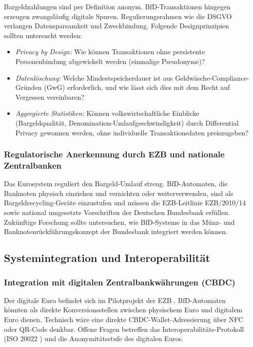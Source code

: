 ﻿\documentclass[a4paper,12pt]{article}
\theoremstyle{definition}
\begin{document}
Bargeldzahlungen sind per Definition anonym.  BfD-Transaktionen hingegen
erzeugen zwangsläufig digitale Spuren.  Regulierungsrahmen wie die DSGVO \cite{gdpr2016}
verlangen Datensparsamkeit und Zweckbindung.  Folgende Designprinzipien sollten
untersucht werden:
\begin{itemize}
  \item \emph{Privacy by Design:} Wie können Transaktionen ohne persistente
        Personenbindung abgewickelt werden (einmalige Pseudonyme)?
  \item \emph{Datenlöschung:} Welche Mindestspeicherdauer ist aus
        Geldwäsche-Compliance-Gründen (GwG) erforderlich, und wie lässt
        sich dies mit dem Recht auf Vergessen vereinbaren?
  \item \emph{Aggregierte Statistiken:} Können volkswirtschaftliche Einblicke
        (Bargeldqualität, Denomination-Umlaufgeschwindigkeit) durch
        Differential Privacy \cite{dwork2006differential} gewonnen werden,
        ohne individuelle Transaktionsdaten preiszugeben?
\end{itemize}

\subsubsection{Regulatorische Anerkennung durch EZB und nationale Zentralbanken}

Das Eurosystem reguliert den Bargeld-Umlauf streng.  BfD-Automaten, die
Banknoten physisch einziehen und vernichten oder weiterverwenden,
sind als Bargeldrecycling-Geräte einzustufen und müssen die EZB-Leitlinie
EZB/2010/14 \cite{ecb2010} sowie national umgesetzte Vorschriften der Deutschen
Bundesbank \cite{bundesbank2024} erfüllen.
Zukünftige Forschung sollte untersuchen, wie BfD-Systeme in das
Münz- und Banknotenrückführungskonzept der Bundesbank integriert werden können.

\subsection{Systemintegration und Interoperabilität}

\subsubsection{Integration mit digitalen Zentralbankwährungen (CBDC)}

Der digitale Euro befindet sich im Pilotprojekt der EZB \cite{ecb2023digital}.
BfD-Automaten könnten als direkte Konversionsstellen zwischen physischem Euro
und digitalem Euro dienen.  Technisch wäre eine direkte CBDC-Wallet-Adressierung
über NFC oder QR-Code denkbar.  Offene Fragen betreffen das Interoperabilitäts-Protokoll
(ISO 20022 \cite{iso20022}) und die Anonymitätsstufe des digitalen Euros.
\end{document}

